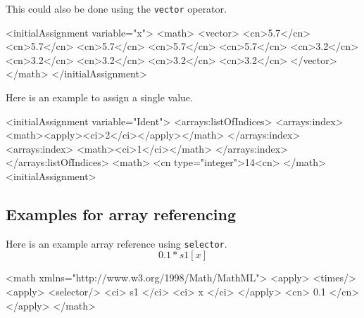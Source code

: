 This could also be done using the {\tt vector} operator.

\begin{example}
<initialAssignment variable="x"> 
 <math>
  <vector> 
   <cn>5.7</cn> 
   <cn>5.7</cn> 
   <cn>5.7</cn> 
   <cn>5.7</cn> 
   <cn>5.7</cn> 
   <cn>3.2</cn> 
   <cn>3.2</cn> 
   <cn>3.2</cn> 
   <cn>3.2</cn> 
   <cn>3.2</cn>
  </vector>
 </math>
</initialAssignment>
\end{example}



Here is an example to assign a single value. 

\begin{example}
<initialAssignment variable="Ident"> 
 <arrays:listOfIndices>
  <arrays:index>
   <math><apply><ci>2</ci></apply></math>
  </arrays:index>
  <arrays:index>
   <math><ci>1</ci></math>
  </arrays:index>
 </arrays:listOfIndices>
 <math>
  <cn type="integer">14<cn>
 </math>
<initialAssignment>
\end{example}

\subsection{Examples for array referencing}

Here is an example array reference using {\tt selector}.
\begin{displaymath}
0.1 * s1[x]
\end{displaymath}
\begin{example}
<math xmlns="http://www.w3.org/1998/Math/MathML">
 <apply>
  <times/>
   <apply>
    <selector/>
     <ci> s1 </ci>
     <ci> x </ci> 
   </apply>
   <cn> 0.1 </cn>
 </apply>
</math>
\end{example}

